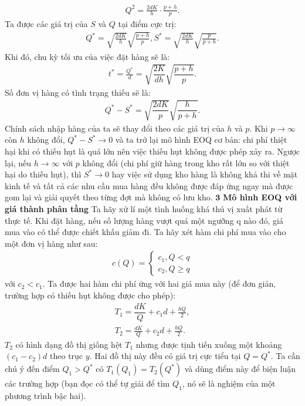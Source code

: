 \begin{multicols}{2}
\begin{align*}
		Q^2 = \frac{2dK}{h}\cdot\frac{p+h}{p}.
	\end{align*}
	Ta được các giá trị của $S$ và $Q$ tại điểm cực trị:
	\begin{align*}
		Q^*=\sqrt{\frac{2dK}{h}}\sqrt{\frac{p+h}{p}},S^*= \sqrt{\frac{2dK}{h}}\sqrt{\frac{p}{p+h}}.
	\end{align*}
	Khi đó, chu kỳ tối ưu của việc đặt hàng sẽ là:
	\begin{align*}
		t^* = \frac{Q^*}{d}= \sqrt{\dfrac{2K}{dh}}\sqrt{\dfrac{p+h}{p}}.
	\end{align*}
	Số đơn vị hàng có tình trạng thiếu sẽ là:
	\begin{align*}
		Q^*- S^* = \sqrt{\dfrac{2dK}{p}}\sqrt{\dfrac{h}{p+h}}.
	\end{align*}
	Chính sách nhập hàng của ta sẽ thay đổi theo các giá trị của $h$ và $p$. Khi $p \to \infty$ còn $h$ không đổi, $Q^*-S^* \to 0$ và ta trở lại mô hình EOQ cơ bản: chi phí thiệt hại khi có thiếu hụt là quá lớn nên việc thiếu hụt không được phép xảy ra. Ngược lại, nếu $h \to \infty$ với $p$ không đổi (chi phí giữ hàng trong kho rất lớn so với thiệt hại do thiếu hụt), thì $S^* \to 0$ hay việc sử dụng kho hàng là không khả thi về mặt kinh tế và tất cả các nhu cầu mua hàng đều không được đáp ứng ngay mà được gom lại và giải quyết theo từng đợt mà không có lưu kho.
	\vskip 0.1cm
	$\pmb{3}$ \textbf{Mô hình EOQ với giá thành phân tầng}
	\vskip 0.1cm
	Ta hãy xử lí một tình huống khá thú vị xuất phát từ thực tế. Khi đặt hàng, nếu số lượng hàng vượt quá một ngưỡng q nào đó, giá mua vào có thể được chiết khấu giảm đi. Ta hãy xét hàm chi phí mua vào cho một đơn vị hàng như sau:
	\begin{align*}
		c(Q)= \begin{cases}
			c_1,Q <q\\
			c_2,Q \ge q
		\end{cases}
	\end{align*}
	với $c_2<c_1$.
	\vskip 0.1cm
	Ta được hai hàm chi phí ứng với hai giá mua này (để đơn giản, trường hợp có thiếu hụt không được cho phép):
	\begin{align*}
		T_1 = \dfrac{dK}{Q} + c_1d  + \frac{hQ}{2},\\
		T_2 = \frac{dK}{Q} + c_2d + \frac{hQ}{2}.
	\end{align*}
	$T_2$ có hình dạng đồ thị giống hệt $T_1$ nhưng được tịnh tiến xuống một khoảng $(c_1-c_2 )d$ theo trục $y$. Hai đồ thị này đều có giá trị cực tiểu tại $Q=Q^*$. Ta cần chú ý đến điểm $Q_1>Q^*$ có $T_1 (Q_1 )=T_2 (Q^*)$ và dùng điểm này để biện luận các trường hợp (bạn đọc có thể tự giải để tìm $Q_1$, nó sẽ là nghiệm của một phương trình bậc hai).

\end{multicols}
